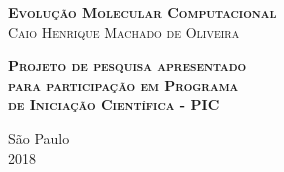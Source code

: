 \begin{center}
\textsc{\textbf{\Large Evolução Molecular Computacional }}
\\\vspace{2cm}
\textsc{\large Caio Henrique Machado de Oliveira }
\end{center}

\vspace{2cm}

\begin{flushright}
\textsc{\textbf{Projeto de pesquisa apresentado\\para participação em Programa\\de Iniciação Científica - PIC}}
\end{flushright}

\vfill
\begin{center}
São Paulo \\ 2018
\end{center}

